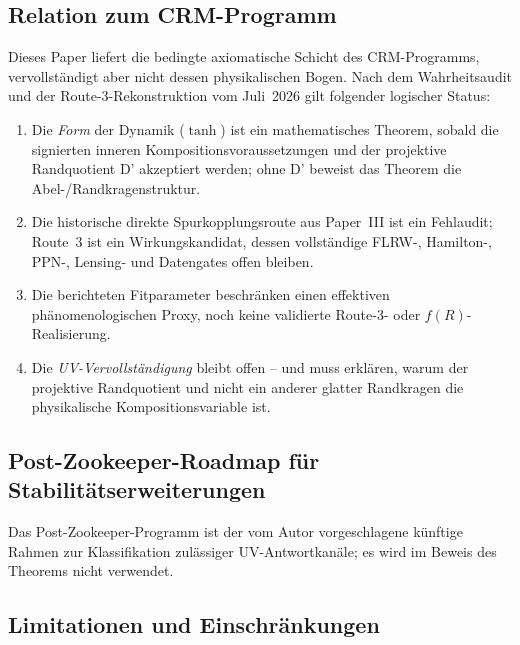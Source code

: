 \documentclass[aps,prd,twocolumn,superscriptaddress,nofootinbib]{revtex4-2}
\begin{document}
\subsection{Relation zum CRM-Programm}

Dieses Paper liefert die bedingte axiomatische Schicht des CRM-Programms, vervollständigt aber nicht dessen physikalischen Bogen. Nach dem Wahrheitsaudit und der Route-3-Rekonstruktion vom Juli~2026 gilt folgender logischer Status:
\begin{enumerate}
\item Die \textit{Form} der Dynamik ($\tanh$) ist ein mathematisches Theorem, sobald die signierten inneren Kompositionsvoraussetzungen und der projektive Randquotient D' akzeptiert werden; ohne D' beweist das Theorem die Abel-/Randkragenstruktur.
\item Die historische direkte Spurkopplungsroute aus Paper~III ist ein Fehlaudit; Route~3 ist ein Wirkungskandidat, dessen vollständige FLRW-, Hamilton-, PPN-, Lensing- und Datengates offen bleiben.
\item Die berichteten Fitparameter beschränken einen effektiven phänomenologischen Proxy, noch keine validierte Route-3- oder $f(R)$-Realisierung.
\item Die \textit{UV-Vervollständigung} bleibt offen -- und muss erklären, warum der projektive Randquotient und nicht ein anderer glatter Randkragen die physikalische Kompositionsvariable ist.
\end{enumerate}

\subsection{Post-Zookeeper-Roadmap für Stabilitätserweiterungen}

Das Post-Zookeeper-Programm ist der vom Autor vorgeschlagene künftige Rahmen zur Klassifikation zulässiger UV-Antwortkanäle; es wird im Beweis des Theorems nicht verwendet.

\subsection{Limitationen und Einschränkungen}
\end{document}
